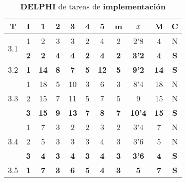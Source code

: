 \documentclass[11pt,a4paper,spanish,twoside]{report}
\begin{document}
\begin{table}[!h]
\centering
  \begin{tabular}{|c|c||c|c|c|c|c||c|c|c||c|}
    \hline
    \textbf{T} & \textbf{I} & \textbf{1} &
    \textbf{2} & \textbf{3} & \textbf{4} & \textbf{5} & \textbf{m}
    &\textbf{$\bar{x}$} &\textbf{M} & \textbf{C}\\    
    \hline \hline

    \multirow{2}{*}{3.1}& 1 & 2 & 3 & 3 & 2 & 4 & 2 & 2'8 & 4 & N \\
    & \textbf{2} & \textbf{2} & \textbf{4} & \textbf{4} & \textbf{2} &
    \textbf{4} & \textbf{2} & \textbf{3'2} & \textbf{4} & \textbf{S} \\
    \hline

    3.2 & \textbf{1} & \textbf{14} & \textbf{8} & \textbf{7} &
    \textbf{5} & \textbf{12} & \textbf{5} & \textbf{9'2} & \textbf{14} &
    \textbf{S} \\ 
    \hline

    \multirow{3}{*}{3.3}
    & 1 & 18 & 5 & 10 & 3 & 6 & 3 & 8'4 & 18 & N \\
    & 2 & 15 & 7 & 11 & 5 & 7 & 5 & 9   & 15 & N \\
    & \textbf{3} & \textbf{15} & \textbf{9} & \textbf{13} & \textbf{7} &
    \textbf{8} & \textbf{7} & \textbf{10'4} & \textbf{15} & \textbf{S} \\
    \hline

    \multirow{3}{*}{3.4}
    & 1 & 7 & 3 & 2 & 2 & 3 & 2 & 3'4 & 7 & N \\
    & 2 & 5 & 3 & 3 & 3 & 4 & 3 & 3'6 & 5 & N \\
    & \textbf{3} & \textbf{4} & \textbf{3} & \textbf{4} & \textbf{3} &
    \textbf{4} & \textbf{3} & \textbf{3'6} & \textbf{4} & \textbf{S} \\
    \hline

    3.5 & \textbf{1} & \textbf{7} & \textbf{3} & \textbf{6} &
    \textbf{5} & \textbf{4} & \textbf{3} & \textbf{5} &\textbf{7} &
    \textbf{S} \\ 
    \hline

  \end{tabular}
  \caption{\textbf{DELPHI} de tareas de \textbf{implementación}}
  \label{Tab:DELPHIimp}
\end{table}
\end{document}

